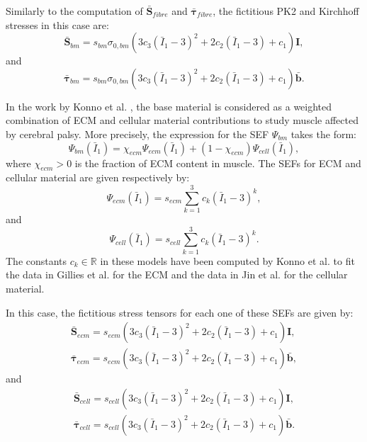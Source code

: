 \documentclass{sfuthesis}
\numberwithin{equation}{section}
\numberwithin{figure}{chapter}
\numberwithin{table}{chapter}
\theoremstyle{definition}
\def\*#1{{\mathbf{#1}}} %
\newcommand{\R}{\mathbb{R}}
\newcommand{\I}{{\bar{I}}}
\def\btau{{\bm{\tau}}}
\begin{document}
Similarly to the computation of $\bar{\*S}_{fibre}$ and $\bar{\btau}_{fibre}$, the fictitious PK2 and Kirchhoff stresses in this case are:
\begin{equation}
    \bar{\*S}_{bm} = s_{bm} \sigma_{0,bm} \left( 3c_3(\I_1-3)^2 + 2c_2 (\I_1-3) + c_1 \right) \*I,
\end{equation}
and
\begin{equation}
    \bar{\btau}_{bm} = s_{bm} \sigma_{0,bm} \left( 3c_3(\I_1-3)^2 + 2c_2 (\I_1-3) + c_1 \right) \bar{\*b}.
\end{equation}

In the work by Konno et al. \cite{KonnoNigamWakeling2021_ECM}, the base material is considered as a weighted combination of ECM and cellular material contributions to study muscle affected by cerebral palsy. More precisely, the expression for the SEF $\Psi_{bm}$ takes the form:
\begin{equation}
    \Psi_{bm}(\I_1) = \chi_{ecm} \Psi_{ecm}(\I_1) + (1-\chi_{ecm}) \Psi_{cell}(\I_1),
\end{equation}
where $\chi_{ecm} > 0$ is the fraction of ECM content in muscle. The SEFs for ECM and cellular material are given respectively by:
\begin{equation}\label{eq:def_Psi_ecm}
    \Psi_{ecm}(\I_1) = s_{ecm} \sum_{k=1}^3 c_k (\I_1 - 3)^k,
\end{equation}
and
\begin{equation}\label{eq:def_Psi_cell}
    \Psi_{cell}(\I_1) = s_{cell} \sum_{k=1}^3 c_k (\I_1 - 3)^k.
\end{equation}
The constants $c_k \in \R$ in these models have been computed by Konno et al. \cite{KonnoNigamWakeling2021_ECM} to fit the data in Gillies et al. \cite{Gillies2011} for the ECM and the data in Jin et al. \cite{Jin2013} for the cellular material.

In this case, the fictitious stress tensors for each one of these SEFs are given by:
\begin{gather}
    \bar{\*S}_{ecm} = s_{ecm} \left( 3c_3(\I_1-3)^2 + 2c_2 (\I_1-3) + c_1 \right) \*I, \\
    \bar{\btau}_{ecm} = s_{ecm} \left( 3c_3(\I_1-3)^2 + 2c_2 (\I_1-3) + c_1 \right) \bar{\*b},
\end{gather}
and
\begin{gather}
    \bar{\*S}_{cell} = s_{cell} \left( 3c_3(\I_1-3)^2 + 2c_2 (\I_1-3) + c_1 \right) \*I, \\
    \bar{\btau}_{cell} = s_{cell} \left( 3c_3(\I_1-3)^2 + 2c_2 (\I_1-3) + c_1 \right) \bar{\*b}.
\end{gather}
\end{document}

